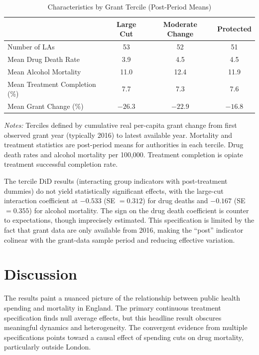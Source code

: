 \documentclass[12pt]{article}
\begin{document}
\begin{table}[H]
\centering
\caption{Characteristics by Grant Tercile (Post-Period Means)}
\label{tab:tercile_chars}
\begin{threeparttable}
\begin{tabular}{lccc}
\toprule
& Large Cut & Moderate Change & Protected \\
\midrule
Number of LAs & 53 & 52 & 51 \\
Mean Drug Death Rate & 3.9 & 4.5 & 4.5 \\
Mean Alcohol Mortality & 11.0 & 12.4 & 11.9 \\
Mean Treatment Completion (\%) & 7.7 & 7.3 & 7.6 \\
Mean Grant Change (\%) & $-26.3$ & $-22.9$ & $-16.8$ \\
\bottomrule
\end{tabular}
\begin{tablenotes}[flushleft]
\small
\item \textit{Notes:} Terciles defined by cumulative real per-capita grant change from first observed grant year (typically 2016) to latest available year. Mortality and treatment statistics are post-period means for authorities in each tercile. Drug death rates and alcohol mortality per 100,000. Treatment completion is opiate treatment successful completion rate.
\end{tablenotes}
\end{threeparttable}
\end{table}

The tercile DiD results (interacting group indicators with post-treatment dummies) do not yield statistically significant effects, with the large-cut interaction coefficient at $-0.533$ (SE $= 0.312$) for drug deaths and $-0.167$ (SE $= 0.355$) for alcohol mortality. The sign on the drug death coefficient is counter to expectations, though imprecisely estimated. This specification is limited by the fact that grant data are only available from 2016, making the ``post'' indicator colinear with the grant-data sample period and reducing effective variation.


\section{Discussion}

The results paint a nuanced picture of the relationship between public health spending and mortality in England. The primary continuous treatment specification finds null average effects, but this headline result obscures meaningful dynamics and heterogeneity. The convergent evidence from multiple specifications points toward a causal effect of spending cuts on drug mortality, particularly outside London.
\end{document}
